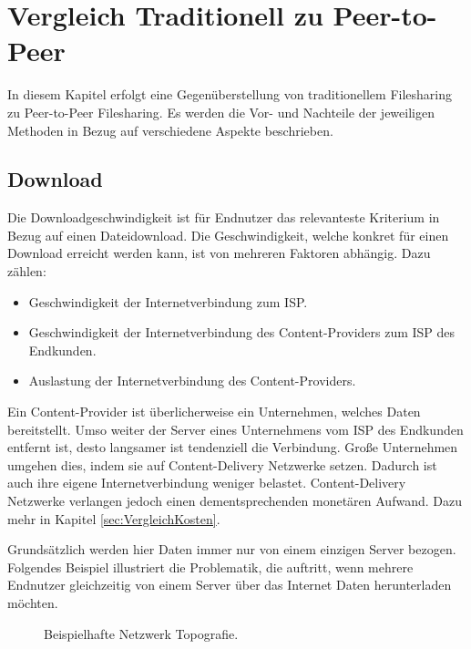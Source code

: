 \chapter{Vergleich Traditionell zu Peer-to-Peer}
\label{cha:Vergleich}

In diesem Kapitel erfolgt eine Gegenüberstellung von traditionellem Filesharing zu Peer-to-Peer Filesharing. Es werden die Vor- und Nachteile der jeweiligen Methoden in Bezug auf verschiedene Aspekte beschrieben.

\section{Download}
\label{sec:VergDownload}
Die Downloadgeschwindigkeit ist für Endnutzer das relevanteste Kriterium in Bezug auf einen Dateidownload. Die Geschwindigkeit, welche konkret für einen Download erreicht werden kann, ist von mehreren Faktoren abhängig. Dazu zählen:
\begin{itemize}
    \item Geschwindigkeit der Internetverbindung zum ISP.
    \item Geschwindigkeit der Internetverbindung des Content-Providers zum ISP des Endkunden.
    \item Auslastung der Internetverbindung des Content-Providers.
\end{itemize} 
Ein Content-Provider ist überlicherweise ein Unternehmen, welches Daten bereitstellt. Umso weiter der Server eines Unternehmens vom ISP des Endkunden entfernt ist, desto langsamer ist tendenziell die Verbindung. Große Unternehmen umgehen dies, indem sie auf Content-Delivery Netzwerke setzen. Dadurch ist auch ihre eigene Internetverbindung weniger belastet. Content-Delivery Netzwerke verlangen jedoch einen dementsprechenden monetären Aufwand. Dazu mehr in Kapitel \ref{sec:VergleichKosten}. 

Grundsätzlich werden hier Daten immer nur von einem einzigen Server bezogen. Folgendes Beispiel illustriert die Problematik, die auftritt, wenn mehrere Endnutzer gleichzeitig von einem Server über das Internet Daten herunterladen möchten. 

\begin{figure}[H]
    \centering
    \caption{Beispielhafte Netzwerk Topografie.}
    \label{fig:NetworkTopography}
\end{figure}


